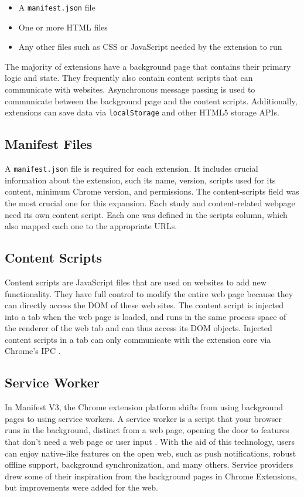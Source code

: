 \begin{itemize}
  \item A \texttt{manifest.json} file
  \item One or more HTML files
  \item Any other files such as CSS or JavaScript needed by the extension to run
\end{itemize}

The majority of extensions have a background page that contains their primary logic and state. They frequently also contain content scripts that can communicate with websites. Asynchronous message passing is used to communicate between the background page and the content scripts. Additionally, extensions can save data via \texttt{localStorage} and other HTML5 storage APIs.

\subsection{Manifest Files}
A \texttt{manifest.json} file is required for each extension. It includes crucial information about the extension, such its name, version, scripts used for its content, minimum Chrome version, and permissions. The content-scripts field was the most crucial one for this expansion. Each study and content-related webpage need its own content script. Each one was defined in the scripts column, which also mapped each one to the appropriate URLs.

\subsection{Content Scripts}
Content scripts are JavaScript files that are used on websites to add new functionality. They have full control to modify the entire web page because they can directly access the DOM of these web sites. The content script is injected into a tab when the web page is loaded, and runs in the same process space of the renderer of the web tab and can thus access its DOM objects. Injected content scripts in a tab can only communicate with the extension core via Chrome's IPC \autocite{liu2012chrome}.

\subsection{Service Worker}
\label{service_worker}
In Manifest V3, the Chrome extension platform shifts from using background pages to using service workers. A service worker is a script that your browser runs in the background, distinct from a web page, opening the door to features that don't need a web page or user input \autocite{chrome2021service}. With the aid of this technology, users can enjoy native-like features on the open web, such as push notifications, robust offline support, background synchronization, and many others. Service providers drew some of their inspiration from the background pages in Chrome Extensions, but improvements were added for the web.

